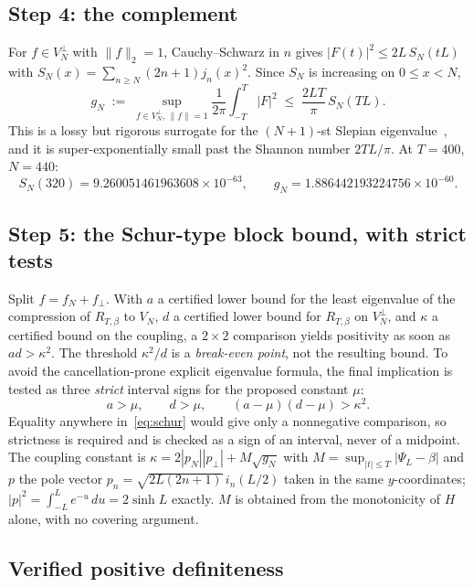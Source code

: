 \documentclass[11pt,a4paper]{article}
\theoremstyle{definition}
\theoremstyle{remark}
\newcommand{\PsiL}{\Psi_{L}}
\begin{document}
\subsection{Step 4: the complement}

For $f \in V_N^{\perp}$ with $\|f\|_2 = 1$, Cauchy--Schwarz in $n$ gives
$|F(t)|^2 \le 2L\, S_N(tL)$ with $S_N(x) = \sum_{n \ge N}(2n+1)j_n(x)^2$. Since
$S_N$ is increasing on $0 \le x < N$,
\[
   g_N \;:=\; \sup_{f \in V_N^{\perp},\, \|f\|=1}
     \frac{1}{2\pi}\int_{-T}^{T}|F|^2
   \;\le\; \frac{2LT}{\pi}\, S_N(TL) .
\]
This is a lossy but rigorous surrogate for the $(N+1)$-st Slepian
eigenvalue~\cite{Slepian},
and it is super-exponentially small past the Shannon number $2TL/\pi$. At
$T = 400$, $N = 440$:
\[
   S_N(320) = 9.260051461963608\times10^{-63},
   \qquad
   g_N = 1.886442193224756\times10^{-60}.
\]

\subsection{Step 5: the Schur-type block bound, with strict tests}

Split $f = f_N + f_{\perp}$. With $a$ a certified lower bound for the least
eigenvalue of the compression of $R_{T,\beta}$ to $V_N$, $d$ a certified lower
bound for $R_{T,\beta}$ on $V_N^{\perp}$, and $\kappa$ a certified bound on the
coupling, a $2\times2$ comparison yields positivity as soon as $ad > \kappa^2$.
The threshold $\kappa^2/d$ is a \emph{break-even point}, not the resulting
bound. To avoid the cancellation-prone explicit eigenvalue formula, the final
implication is tested as three \emph{strict} interval signs for the proposed
constant $\mu$:
\begin{equation}
\label{eq:schur}
   a > \mu , \qquad d > \mu , \qquad (a - \mu)(d - \mu) > \kappa^2 .
\end{equation}
Equality anywhere in~\eqref{eq:schur} would give only a nonnegative comparison,
so strictness is required and is checked as a sign of an interval, never of a
midpoint. The coupling constant is
$\kappa = 2|p_N||p_{\perp}| + M\sqrt{g_N}$ with
$M = \sup_{|t| \le T}|\PsiL - \beta|$ and $p$ the pole vector
$p_n = \sqrt{2L(2n+1)}\, i_n(L/2)$ taken in the same $y$-coordinates; $|p|^2 =
\int_{-L}^{L} e^{-u}\,du = 2\sinh L$ exactly. $M$ is obtained from the
monotonicity of $H$ alone, with no covering argument.

\subsection{Verified positive definiteness}
\label{sec:pd}
\end{document}
